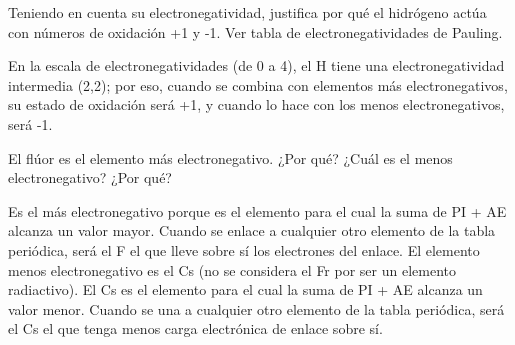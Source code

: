 \begin{question}
    Teniendo en cuenta su electronegatividad, justifica por
    qué el hidrógeno actúa con números de oxidación +1 y -1. Ver tabla de electronegatividades de Pauling.


    \begin{solu}
        En la escala de electronegatividades (de 0 a 4), el H tiene
        una electronegatividad intermedia (2,2); por eso, cuando se
        combina con elementos más electronegativos, su estado de
        oxidación será +1, y cuando lo hace con los menos electronegativos,
        será -1.
    \end{solu}

\end{question}

\begin{question}
    El flúor es el elemento más electronegativo. ¿Por qué?
    ¿Cuál es el menos electronegativo? ¿Por qué?


    \begin{solu}
        Es el más electronegativo porque es el elemento para el cual
        la suma de PI + AE alcanza un valor mayor. Cuando se enlace
        a cualquier otro elemento de la tabla periódica, será el F el
        que lleve sobre sí los electrones del enlace.
        El elemento menos electronegativo es el Cs (no se considera
        el Fr por ser un elemento radiactivo). El Cs es el elemento
        para el cual la suma de PI + AE alcanza un valor menor. Cuando
        se una a cualquier otro elemento de la tabla periódica,
        será el Cs el que tenga menos carga electrónica de enlace
        sobre sí.
    \end{solu}

\end{question}

